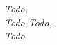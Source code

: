 
\begin{dedicatoria}

    \vspace*{\fill}
    \centering
    \noindent
    \textit{\lang
    {
        Todo, \\
        Todo
    }
    {
        Todo, \\
        Todo
    }}
    \vspace*{\fill}

\end{dedicatoria}


